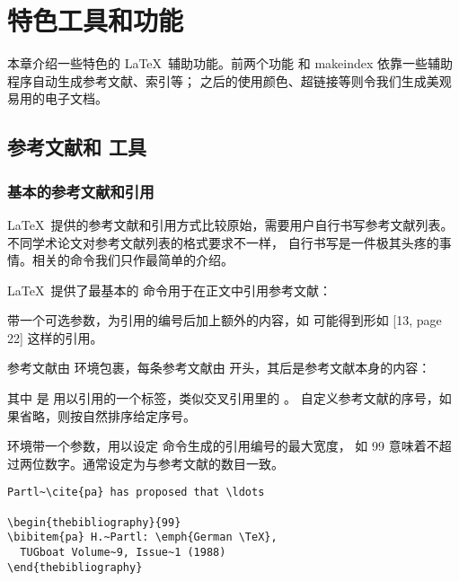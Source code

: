 \chapter{特色工具和功能}

\begin{intro}
本章介绍一些特色的 \LaTeX\ 辅助功能。前两个功能  和 makeindex 依靠一些辅助程序自动生成参考文献、索引等；
之后的使用颜色、超链接等则令我们生成美观易用的电子文档。
\end{intro}

\section{参考文献和  工具}

\subsection{基本的参考文献和引用}

\LaTeX\ 提供的参考文献和引用方式比较原始，需要用户自行书写参考文献列表。不同学术论文对参考文献列表的格式要求不一样，
自行书写是一件极其头疼的事情。相关的命令我们只作最简单的介绍。

\LaTeX\ 提供了最基本的  命令用于在正文中引用参考文献：
\begin{command}
\end{command}

 带一个可选参数，为引用的编号后加上额外的内容，如  可能得到形如 [13, page 22] 这样的引用。

参考文献由  环境包裹，每条参考文献由  开头，其后是参考文献本身的内容：
\begin{command}
\end{command}

其中  是  用以引用的一个标签，类似交叉引用里的 。
 自定义参考文献的序号，如果省略，则按自然排序给定序号。

 环境带一个参数，用以设定  命令生成的引用编号的最大宽度，
如 99 意味着不超过两位数字。通常设定为与参考文献的数目一致。

\begin{verbatim}
Partl~\cite{pa} has proposed that \ldots

\begin{thebibliography}{99}
\bibitem{pa} H.~Partl: \emph{German \TeX}, 
  TUGboat Volume~9, Issue~1 (1988)
\end{thebibliography}
\end{verbatim}

